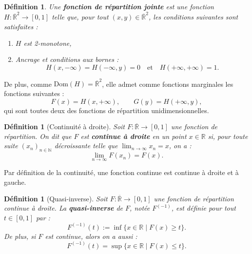 \documentclass[a4paper,11pt]{amsbook}
\numberwithin{equation}{chapter}
\newtheorem{definition}	[theoreme]   {Définition}
\theoremstyle{definition}
\begin{document}
\begin{definition}\label{def:fonc_rep_jointe}
Une \textbf{fonction de répartition jointe} est une fonction \( H : \overline{\mathbb{R}}^2 \to [0,1] \) telle que, pour tout \( (x, y) \in \overline{\mathbb{R}}^2 \), les conditions suivantes sont satisfaites :
\begin{enumerate}
    \item \( H \) est \emph{2-monotone},
    \item Ancrage et conditions aux bornes :
    \[
    H(x, -\infty) = H(-\infty, y) = 0 \quad \text{et} \quad H(+\infty, +\infty) = 1.
    \]
\end{enumerate}
\end{definition}

De plus, comme \( \text{Dom}(H) = \overline{\mathbb{R}}^2\), elle admet comme fonctions marginales les fonctions suivantes :
\[
F(x) = H(x, +\infty), \qquad G(y) = H(+\infty, y),
\]
qui sont toutes deux des fonctions de répartition unidimensionnelles.

\begin{definition}[Continuité à droite]\label{def:cont_droite}
Soit \( F : \overline{\mathbb{R}} \to [0,1] \) une fonction de répartition.  
On dit que \( F \) est \textbf{continue à droite} en un point \( x \in \mathbb{R} \) si, pour toute suite \( (x_n)_{n \in \mathbb{N}} \) décroissante telle que \( \lim_{n \to \infty} x_n = x \), on a :
\[
\lim_{n \to \infty} F(x_n) = F(x).
\]
\end{definition}
Par définition de la continuité, une fonction continue est continue à droite et à gauche.


\begin{definition}[Quasi-inverse]\label{def:quasi}
Soit \( F : \overline{\mathbb{R}} \to [0,1] \) une fonction de répartition continue à droite. La \textbf{quasi-inverse} de \( F \), notée \( F^{(-1)} \), est définie pour tout \( t \in [0,1] \) par :
\[
F^{(-1)}(t) := \inf\{ x \in \mathbb{R} \mid F(x) \geq t \}.
\]
De plus, si \( F \) est continue, alors on a aussi :
\[
F^{(-1)}(t) = \sup\{x \in \mathbb{R} \mid F(x) \leq t\}.
\]
\end{definition}
\end{document}
